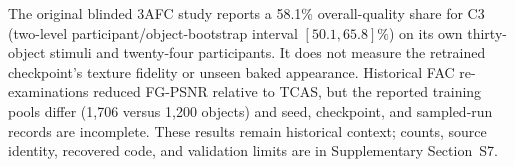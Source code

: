 \documentclass[times,twocolumn,final]{elsarticle}
\providecommand{\DIFadd}[1]{{\protect\color{blue} \sf #1}} %
\providecommand{\DIFaddbegin}{} %
\providecommand{\DIFaddend}{} %
\providecommand{\DIFdelbegin}{} %
\providecommand{\DIFdelend}{} %
\begin{document}
\DIFdelbegin %
\DIFdelend \DIFaddbegin \DIFadd{The original blinded 3AFC study reports a 58.1\% overall-quality share for C3 (two-level participant/object-bootstrap interval $[50.1,65.8]\%$) on its own thirty-object stimuli and twenty-four participants. It does not measure the retrained checkpoint's texture fidelity or unseen baked appearance. Historical FAC re-examinations reduced FG-PSNR relative to TCAS, but the reported training pools differ (1,706 versus 1,200 objects) and seed, checkpoint, and sampled-run records are incomplete. These results remain historical context; counts, source identity, recovered code, and validation limits are in Supplementary Section~S7.
}\DIFaddend


\DIFdelbegin %
\DIFdelend \DIFaddbegin \FloatBarrier
\end{document}
